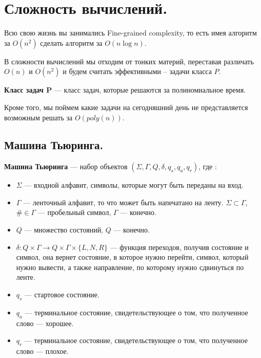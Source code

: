 \section{Сложность вычислений.}%
\label{sec:Сложность вычислений.}

Всю свою жизнь вы занимались Fine-grained complexity, 
то есть имея алгоритм за $O(n^2)$ сделать алгоритм за  $O(n\log n)$.

В сложности вычислений мы отходим от тонких материй, переставая различать $O(n)$ и  $O(n^2)$ 
и будем считать эффективными -- задачи класса  $P$.

\begin{Def}
    \textbf{Класс задач P} --- класс задач, которые решаются за полиномиальное время.
\end{Def}

Кроме того, мы поймем какие задачи на сегодняшний день не представляется возможным решать за $O(poly(n))$.

\subsection{Машина Тьюринга.}%
\label{sub:Машина Тьюринга.}
\begin{Def}
    \textbf{Машина Тьюринга} --- набор объектов $(\Sigma, \Gamma, Q, \delta, q_s, q_a, q_r)$, где :
    \begin{itemize}
        \item $\Sigma$ --- входной алфавит, символы, которые могут быть переданы на вход.
        \item $\Gamma$ --- ленточный алфавит, то что может быть напечатано на ленту. 
            $\Sigma \subset \Gamma$, $\# \in \Gamma$ --- пробельный символ, $\Gamma$ --- конечно.
        \item $Q$ --- множество состояний, $Q$ --- конечно.
        \item $\delta: Q \times \Gamma \rightarrow Q \times \Gamma \times \{L, N, R\}$ --- функция переходов, 
            получив состояние и символ, она вернет состояние, в которое нужно перейти, символ, который нужно вывести, 
            а также направление, по которому нужно сдвинуться по ленте.
        \item $q_s$ --- стартовое состояние.
        \item $q_a$ --- терминальное состояние, свидетельствующее о том, что полученное слово --- хорошее.
        \item $q_r$ --- терминальное состояние, свидетельствующее о том, что полученное слово --- плохое.
    \end{itemize}
\end{Def}

